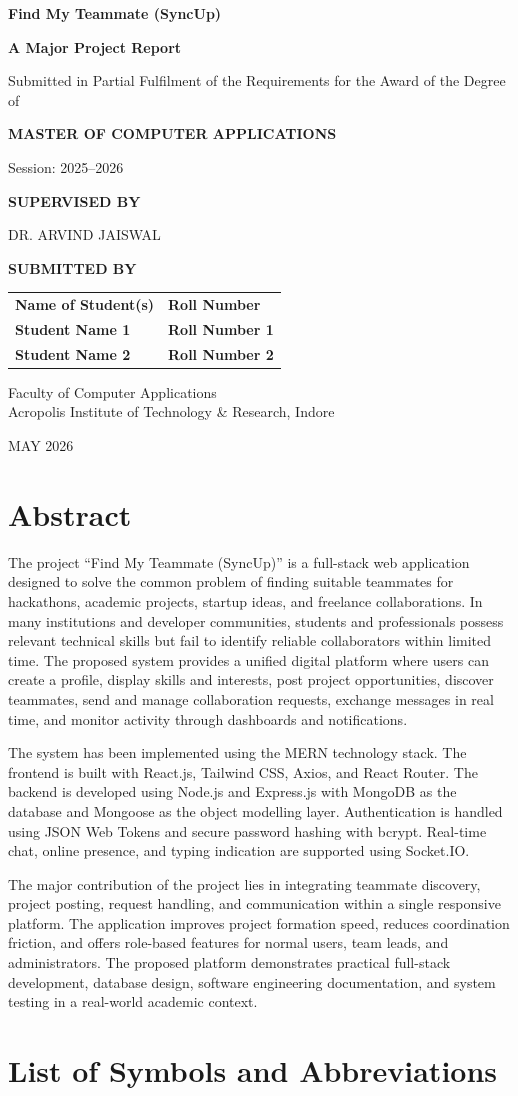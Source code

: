 \documentclass[12pt,a4paper,oneside]{report}
\makeatletter
\newcommand{\projecttitle}{Find My Teammate (SyncUp)}
\newcommand{\reporttype}{A Major Project Report}
\newcommand{\degree}{Master of Computer Applications}
\newcommand{\sessionyear}{2025--2026}
\newcommand{\submissionmonthyear}{May 2026}
\newcommand{\supervisorname}{DR. ARVIND JAISWAL}
\newcommand{\studentone}{\textbf{Student Name 1}}
\newcommand{\rollone}{\textbf{Roll Number 1}}
\newcommand{\studenttwo}{\textbf{Student Name 2}}
\newcommand{\rolltwo}{\textbf{Roll Number 2}}
\newcommand{\college}{Faculty of Computer Applications\\Acropolis Institute of Technology \& Research, Indore}
\newcommand{\makecoverpage}{
  \begin{titlepage}
    \thispagestyle{empty}
    \begin{center}
      \vspace*{0.5cm}
      {\fontsize{24}{28}\selectfont\bfseries \projecttitle \par}
      \vspace{1.1cm}
      {\fontsize{14}{18}\selectfont\bfseries \reporttype \par}
      \vspace{0.9cm}
      {\fontsize{12}{16}\selectfont Submitted in Partial Fulfilment of the Requirements for the Award of the Degree of\par}
      \vspace{0.6cm}
      {\fontsize{14}{18}\selectfont\bfseries \MakeUppercase{\degree}\par}
      \vspace{1cm}
      \fbox{
        \begin{minipage}[c][3.0cm][c]{3.0cm}
          \centering
          \textbf{COLLEGE\\LOGO}
        \end{minipage}
      }
      \vspace{1cm}

      {\fontsize{12}{16}\selectfont Session: \sessionyear\par}
      \vspace{1cm}

      {\fontsize{14}{18}\selectfont\bfseries SUPERVISED BY\par}
      \vspace{0.4cm}
      {\fontsize{12}{16}\selectfont \supervisorname\par}
      \vspace{1cm}

      {\fontsize{14}{18}\selectfont\bfseries SUBMITTED BY\par}
      \vspace{0.5cm}
      \begin{tabular}{p{2.7in}p{2.1in}}
        \centering \textbf{Name of Student(s)} & \centering \textbf{Roll Number} \tabularnewline
        \studentone & \rollone \tabularnewline
        \studenttwo & \rolltwo \tabularnewline
      \end{tabular}

      \vfill
      {\fontsize{14}{18}\selectfont \college\par}
      \vspace{0.4cm}
      {\fontsize{14}{18}\selectfont \MakeUppercase{\submissionmonthyear}\par}
    \end{center}
  \end{titlepage}
}
\renewcommand\tableofcontents{%
  \pagestyle{empty}%
  \chapter*{\contentsname
    \@mkboth{\MakeUppercase\contentsname}{\MakeUppercase\contentsname}}%
  \thispagestyle{empty}%
  \@starttoc{toc}%
}
\renewcommand\listoftables{%
  \pagestyle{empty}%
  \chapter*{\listtablename}%
  \thispagestyle{empty}%
  \@starttoc{lot}%
}
\renewcommand\listoffigures{%
  \pagestyle{empty}%
  \chapter*{\listfigurename}%
  \thispagestyle{empty}%
  \@starttoc{lof}%
}
\makeatother
\begin{document}
\makecoverpage

\chapter*{Abstract}
\thispagestyle{empty}

The project ``\projecttitle'' is a full-stack web application designed to solve the common problem of finding suitable teammates for hackathons, academic projects, startup ideas, and freelance collaborations. In many institutions and developer communities, students and professionals possess relevant technical skills but fail to identify reliable collaborators within limited time. The proposed system provides a unified digital platform where users can create a profile, display skills and interests, post project opportunities, discover teammates, send and manage collaboration requests, exchange messages in real time, and monitor activity through dashboards and notifications.

\vspace{0.5em}
The system has been implemented using the MERN technology stack. The frontend is built with React.js, Tailwind CSS, Axios, and React Router. The backend is developed using Node.js and Express.js with MongoDB as the database and Mongoose as the object modelling layer. Authentication is handled using JSON Web Tokens and secure password hashing with bcrypt. Real-time chat, online presence, and typing indication are supported using Socket.IO.

\vspace{0.5em}
The major contribution of the project lies in integrating teammate discovery, project posting, request handling, and communication within a single responsive platform. The application improves project formation speed, reduces coordination friction, and offers role-based features for normal users, team leads, and administrators. The proposed platform demonstrates practical full-stack development, database design, software engineering documentation, and system testing in a real-world academic context.


\tableofcontents
\listoftables
\listoffigures

\chapter*{List of Symbols and Abbreviations}
\thispagestyle{empty}
\end{document}

